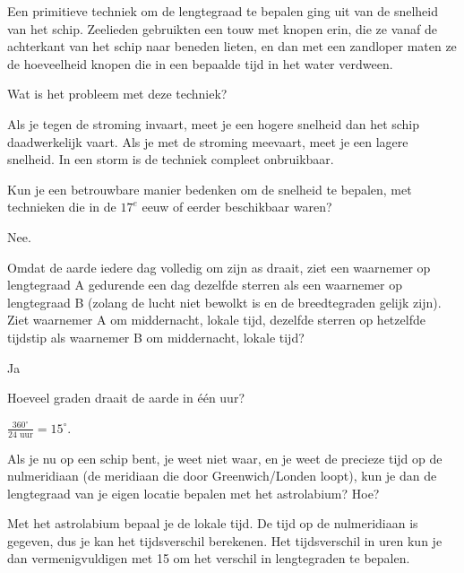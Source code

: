 \begin{opgave}
 Een primitieve techniek om de lengtegraad te bepalen ging uit van de snelheid van het schip. Zeelieden gebruikten een touw met knopen erin, die ze vanaf de achterkant van het schip naar beneden lieten, en dan met een zandloper maten ze de hoeveelheid knopen die in een bepaalde tijd in het water verdween.
 \begin{subopgave}
  Wat is het probleem met deze techniek?
  \begin{antwoord}
   Als je tegen de stroming invaart, meet je een hogere snelheid dan het schip daadwerkelijk vaart. Als je met de stroming meevaart, meet je een lagere snelheid. In een storm is de techniek compleet onbruikbaar.
  \end{antwoord}
 \end{subopgave}
 \begin{subopgave}
 Kun je een betrouwbare manier bedenken om de snelheid te bepalen, met technieken die in de $17^e$ eeuw of eerder beschikbaar waren?
 \begin{antwoord}
  Nee.
 \end{antwoord}
 \end{subopgave}
\end{opgave}

\begin{opgave}
Omdat de aarde iedere dag volledig om zijn as draait, ziet een waarnemer op lengtegraad A gedurende een dag dezelfde sterren als een waarnemer op lengtegraad B (zolang de lucht niet bewolkt is en de breedtegraden gelijk zijn). Ziet waarnemer A om middernacht, lokale tijd, dezelfde sterren op hetzelfde tijdstip als waarnemer B om middernacht, lokale tijd?
\begin{antwoord}
 Ja
\end{antwoord}
\end{opgave}

\begin{opgave}
Hoeveel graden draait de aarde in \'e\'en uur?
\begin{antwoord}
 $\frac{360^{\circ}}{24 \textrm{ uur}} = 15^{\circ}$.
\end{antwoord}
\end{opgave}

\begin{opgave}
 Als je nu op een schip bent, je weet niet waar, en je weet de precieze tijd op de nulmeridiaan (de meridiaan die door Greenwich/Londen loopt), kun je dan de lengtegraad van je eigen locatie bepalen met het astrolabium? Hoe?
 \begin{antwoord}
  Met het astrolabium bepaal je de lokale tijd. De tijd op de nulmeridiaan is gegeven, dus je kan het tijdsverschil berekenen. Het tijdsverschil in uren kun je dan vermenigvuldigen met 15 om het verschil in lengtegraden te bepalen.
 \end{antwoord}
\end{opgave}

